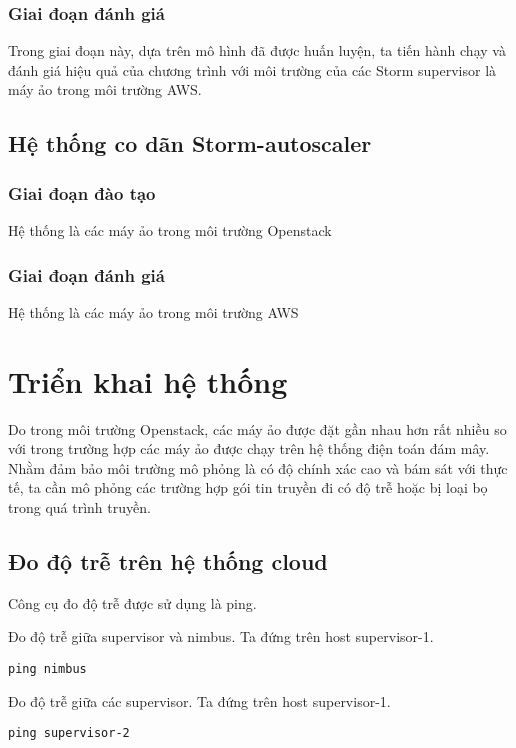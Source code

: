 \subsubsection{Giai đoạn đánh giá}
Trong giai đoạn này, dựa trên mô hình đã được huấn luyện, ta tiến hành chạy và đánh giá hiệu quả của chương trình với môi trường của các Storm supervisor là máy ảo trong môi trường AWS.

\subsection{Hệ thống co dãn Storm-autoscaler}

\subsubsection{Giai đoạn đào tạo}
Hệ thống là các máy ảo trong môi trường Openstack

\subsubsection{Giai đoạn đánh giá}
Hệ thống là các máy ảo trong môi trường AWS

\section{Triển khai hệ thống}
Do trong môi trường Openstack, các máy ảo được đặt gần nhau hơn rất nhiều so với trong trường hợp các máy ảo được chạy trên hệ thống điện toán đám mây.
Nhằm đảm bảo môi trường mô phỏng là có độ chính xác cao và bám sát với thực tế, ta cần mô phỏng các trường hợp gói tin truyền đi có độ trễ hoặc bị loại bọ trong quá trình truyền.

\subsection{Đo độ trễ trên hệ thống cloud}

Công cụ đo độ trễ được sử dụng là ping\autocite{ping_utility}.

Đo độ trễ giữa supervisor và nimbus. Ta đứng trên host supervisor-1.
\begin{lstlisting}
ping nimbus
\end{lstlisting}

Đo độ trễ giữa các supervisor. Ta đứng trên host supervisor-1.
\begin{lstlisting}
ping supervisor-2
\end{lstlisting}

